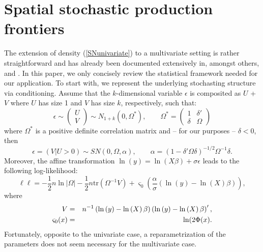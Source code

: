 \documentclass[11pt,parskip,abstracton,notitlepage]{scrartcl}
\begin{document}
\section{Spatial stochastic production frontiers}\label{sub:multisn}
%
The extension of density (\ref{SNunivariate}) to a multivariate setting is rather straightforward and has already been documented extensively in, amongst others, \citet{AZZALINI1999} \citet{AZZALINI2005} and \citet{ARELLANOVALLE2006}. In this paper, we only concisely review the statistical framework needed for our application. To start with, we represent the underlying stochasting structure via conditioning. Assume that the $k$-dimensional variable $\epsilon $ is composited as $U$ + $V$ where $U$ has size 1 and $V$ has size $k$, respectively, such that:
\begin{equation}
\epsilon   \sim \begin{pmatrix} U \\ V \end{pmatrix} \sim N_{1+k}\left(0,\Omega^\ast\right), \qquad \Omega^\ast=\begin{pmatrix} 1 & \delta' \\ \delta & \Omega \end{pmatrix}
\label{stocstruc}
\end{equation}
where $\Omega^\ast$ is a positive definite correlation matrix and -- for our purposes -- $\delta<0$, then 
\begin{equation}
\epsilon  = (V|U >0) \sim SN(0, \Omega, \alpha), \qquad \alpha = (1- \delta'\Omega\delta)^{-1/2}\Omega^{-1}\delta.
\end{equation}
Moreover, the affine transformation $\ln(y) = \ln \left(X \beta\right) + \sigma \epsilon $ leads to the following log-likelihood:
\begin{equation}
\ell\ell  = -\frac{1}{2}n \ln |\Omega| - \frac{1}{2}n \text{tr} (\Omega^{-1}V) + 
 \varsigma_0 \left( \frac{\alpha}{\sigma} \left(\ln \left(y\right)  -\ln \left(X\right) \beta \right) \right),
 \label{ll}
\end{equation}
where 
\begin{eqnarray}
V &=& n^{-1}\left(\ln \left(y\right)  -\ln \left(X\right) \beta \right)\left(\ln \left(y\right)  -\ln \left(X\right) \beta \right)', \notag \\
\varsigma_0(x)&=&\ln(2\Phi(x). \notag
\end{eqnarray}
%
Fortunately, opposite to the univariate case, a reparametrization of the parameters does not seem necessary for the multivariate case. 
\end{document}

